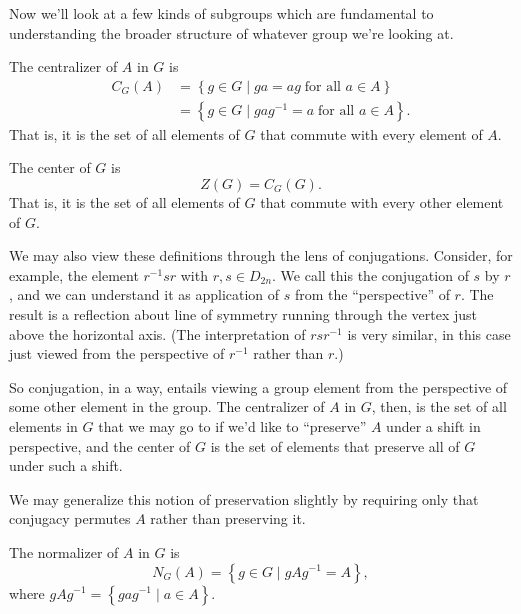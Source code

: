 \documentclass[../m171main.tex]{subfiles}
\begin{document}
Now we'll look at a few kinds of subgroups which are fundamental to understanding the broader structure of whatever group we're looking at.

\pagebreak

\begin{definition}[Centralizer]
    The centralizer of $A$ in $G$ is
    \begin{align*}
        C_G(A) &= \left\{ g \in G \;|\; ga = ag \;\text{for all $a \in A$} \right\} \\
        &= \left\{ g \in G \;|\; gag^{-1} = a \;\text{for all $a \in A$} \right\}.
    \end{align*}
    That is, it is the set of all elements of $G$ that commute with every element of $A$.
\end{definition}

\begin{definition}[Center]
    The center of $G$ is
    \[ Z(G) = C_G(G). \]
    That is, it is the set of all elements of $G$ that commute with every other element of $G$.
\end{definition}

We may also view these definitions through the lens of conjugations.
Consider, for example, the element $r^{-1} s r$ with $r,s \in D_{2n}$.
We call this the conjugation of $s$ by $r$, and we can understand it as application of $s$ from the ``perspective'' of $r$.
The result is a reflection about line of symmetry running through the vertex just above the horizontal axis.
(The interpretation of $rs r^{-1}$ is very similar, in this case just viewed from the perspective of $r^{-1}$ rather than $r$.)

So conjugation, in a way, entails viewing a group element from the perspective of some other element in the group.
The centralizer of $A$ in $G$, then, is the set of all elements in $G$ that we may go to if we'd like to ``preserve'' $A$ under a shift in perspective, and the center of $G$ is the set of elements that preserve all of $G$ under such a shift.

We may generalize this notion of preservation slightly by requiring only that conjugacy permutes $A$ rather than preserving it.

\begin{definition}[Normalizer]
    The normalizer of $A$ in $G$ is
    \[ N_G(A) = \left\{ g \in G \;|\; gAg^{-1} = A \right\}, \]
    where $gAg^{-1} = \left\{ gag^{-1} \;|\; a \in A \right\}$.
\end{definition}
\end{document}
